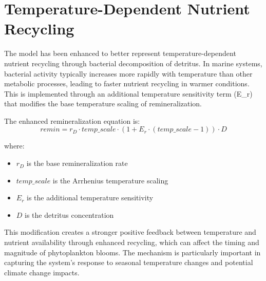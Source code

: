 \section{Temperature-Dependent Nutrient Recycling}

The model has been enhanced to better represent temperature-dependent nutrient recycling through bacterial decomposition of detritus. In marine systems, bacterial activity typically increases more rapidly with temperature than other metabolic processes, leading to faster nutrient recycling in warmer conditions. This is implemented through an additional temperature sensitivity term (E_r) that modifies the base temperature scaling of remineralization.

The enhanced remineralization equation is:
\[ remin = r_D \cdot temp\_scale \cdot (1 + E_r \cdot (temp\_scale - 1)) \cdot D \]

where:
\begin{itemize}
\item $r_D$ is the base remineralization rate
\item $temp\_scale$ is the Arrhenius temperature scaling
\item $E_r$ is the additional temperature sensitivity
\item $D$ is the detritus concentration
\end{itemize}

This modification creates a stronger positive feedback between temperature and nutrient availability through enhanced recycling, which can affect the timing and magnitude of phytoplankton blooms. The mechanism is particularly important in capturing the system's response to seasonal temperature changes and potential climate change impacts.

